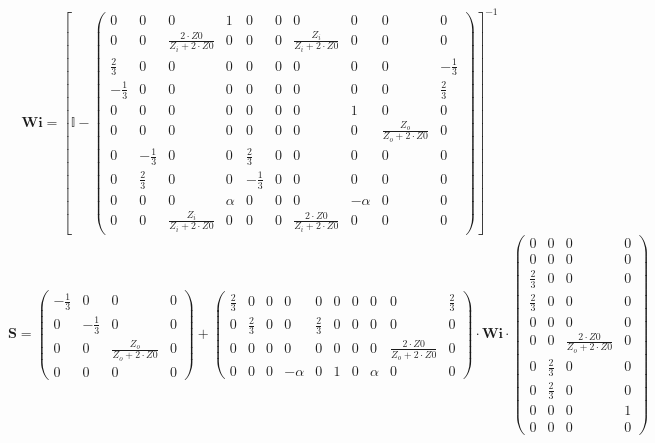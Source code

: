 \[ \mathbf{Wi} =  \left[ \mathbb{I}  - \left(\begin{smallmatrix} 0 & 0
& 0 & 1 & 0 & 0 & 0 & 0 & 0 & 0 \\ 0 & 0 & \frac{2\cdot Z0}{Z_i+2\cdot
Z0} & 0 & 0 & 0 & \frac{Z_i}{Z_i+2\cdot Z0} & 0 & 0 & 0 \\ \frac{2}{3}
& 0 & 0 & 0 & 0 & 0 & 0 & 0 & 0 & -\frac{1}{3} \\ -\frac{1}{3} & 0 & 0
& 0 & 0 & 0 & 0 & 0 & 0 & \frac{2}{3} \\ 0 & 0 & 0 & 0 & 0 & 0 & 0 & 1
& 0 & 0 \\ 0 & 0 & 0 & 0 & 0 & 0 & 0 & 0 & \frac{Z_o}{Z_o+2\cdot Z0} &
0 \\ 0 & -\frac{1}{3} & 0 & 0 & \frac{2}{3} & 0 & 0 & 0 & 0 & 0 \\ 0 &
\frac{2}{3} & 0 & 0 & -\frac{1}{3} & 0 & 0 & 0 & 0 & 0 \\ 0 & 0 & 0 &
\alpha & 0 & 0 & 0 & -\alpha & 0 & 0 \\ 0 & 0 & \frac{Z_i}{Z_i+2\cdot
Z0} & 0 & 0 & 0 & \frac{2\cdot Z0}{Z_i+2\cdot Z0} & 0 & 0 & 0
\end{smallmatrix}\right) \right]^{-1}  \]
\[ \mathbf{S} = \left(\begin{smallmatrix} -\frac{1}{3} & 0 & 0 & 0 \\
0 & -\frac{1}{3} & 0 & 0 \\ 0 & 0 & \frac{Z_o}{Z_o+2\cdot Z0} & 0 \\ 0
& 0 & 0 & 0 \end{smallmatrix}\right) + \left(\begin{smallmatrix}
\frac{2}{3} & 0 & 0 & 0 & 0 & 0 & 0 & 0 & 0 & \frac{2}{3} \\ 0 &
\frac{2}{3} & 0 & 0 & \frac{2}{3} & 0 & 0 & 0 & 0 & 0 \\ 0 & 0 & 0 & 0
& 0 & 0 & 0 & 0 & \frac{2\cdot Z0}{Z_o+2\cdot Z0} & 0 \\ 0 & 0 & 0 &
-\alpha & 0 & 1 & 0 & \alpha & 0 & 0 \end{smallmatrix}\right) \cdot
\mathbf{Wi} \cdot\left(\begin{smallmatrix} 0 & 0 & 0 & 0 \\ 0 & 0 & 0
& 0 \\ \frac{2}{3} & 0 & 0 & 0 \\ \frac{2}{3} & 0 & 0 & 0 \\ 0 & 0 & 0
& 0 \\ 0 & 0 & \frac{2\cdot Z0}{Z_o+2\cdot Z0} & 0 \\ 0 & \frac{2}{3}
& 0 & 0 \\ 0 & \frac{2}{3} & 0 & 0 \\ 0 & 0 & 0 & 1 \\ 0 & 0 & 0 & 0
\end{smallmatrix}\right) \]

